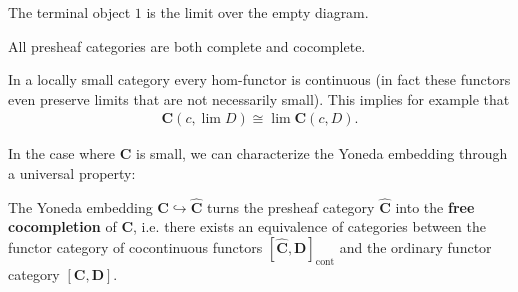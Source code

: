     \begin{example}
        The terminal object $1$ is the limit over the empty diagram.
    \end{example}

    \begin{example}\label{cat:complete_presheaf_category}
        All presheaf categories are both complete and cocomplete.
    \end{example}

    \begin{example}
        In a locally small category every hom-functor is continuous (in fact these functors even preserve limits that are not necessarily small). This implies for example that
        \begin{gather}
            \mathbf{C}(c, \lim D) \cong \lim\mathbf{C}(c, D).
        \end{gather}
    \end{example}

    In the case where $\mathbf{C}$ is small, we can characterize the Yoneda embedding through a universal property:
    \begin{uproperty}\label{cat:free_cocompletion}
        The Yoneda embedding $\mathbf{C}\hookrightarrow\widehat{\mathbf{C}}$ turns the presheaf category $\widehat{\mathbf{C}}$ into the \textbf{free cocompletion} of $\mathbf{C}$, i.e. there exists an equivalence of categories between the functor category of cocontinuous functors $[\widehat{\mathbf{C}}, \mathbf{D}]_{\text{cont}}$ and the ordinary functor category $[\mathbf{C}, \mathbf{D}]$.
    \end{uproperty}

